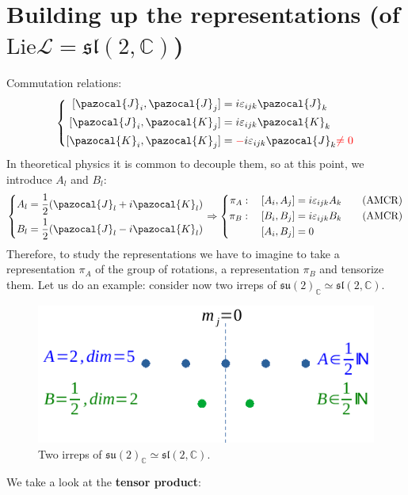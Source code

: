 \documentclass[../main.tex]{subfiles}
\begin{document}
\section{Building up the representations (of $\textrm{Lie}\mathcal{L}=\mathfrak{sl}(2,\mathbb{C})$)}
Commutation relations:
\[
\left\{
\begin{aligned}
[\pazocal{J}_i,\pazocal{J}_j]&=i\varepsilon_{ijk}\pazocal{J}_k\\
[\pazocal{J}_i,\pazocal{K}_j]&=i\varepsilon_{ijk}\pazocal{K}_k\\
[\pazocal{K}_i,\pazocal{K}_j]&={\color{red}-}i\varepsilon_{ijk}\pazocal{J}_k{\color{red}\neq 0}
\end{aligned}
\right.
\]
In theoretical physics it is common to decouple them, so at this point, we introduce $A_l$ and $B_l$:
\[
\left\{
\begin{aligned}
A_l&=\frac{1}{2}(\pazocal{J}_l+i\pazocal{K}_l)\\
B_l&=\frac{1}{2}(\pazocal{J}_l-i\pazocal{K}_l)
\end{aligned}
\right.
\Rightarrow
\left\{
\begin{aligned}
\pi_A:\quad [A_i,A_j]&=i\varepsilon_{ijk}A_k \qquad \textrm{(AMCR)}\\
\pi_B:\quad [B_i,B_j]&=i\varepsilon_{ijk}B_k\qquad \textrm{(AMCR)}\\
[A_i,B_j]&=0
\end{aligned}
\right.
\]
Therefore, to study the representations we have to imagine to take a representation $\pi_A$ of the group of rotations, a representation $\pi_B$ and tensorize them. Let us do an example: consider now two irreps of $\mathfrak{su}(2)_\mathbb{C}\simeq\mathfrak{sl}(2,\mathbb{C})$.
\begin{figure}[h!]
    \centering
    \includegraphics{images/tensor_product.pdf}
    \caption{Two irreps of $\mathfrak{su}(2)_\mathbb{C}\simeq\mathfrak{sl}(2,\mathbb{C})$.}
\end{figure}
We take a look at the \textbf{tensor product}:
\end{document}
